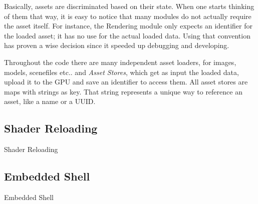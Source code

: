 Basically, assets are discriminated based on their state. When one starts thinking of them that
way, it is easy to notice that many modules do not actually require the asset itself. For
instance, the Rendering module only expects an identifier for the loaded asset; it has no use
for the actual loaded data. Using that convention has proven a wise decision since it speeded
up debugging and developing.

Throughout the code there are many independent asset loaders, for images, models, scenefiles etc..
and \textit{Asset Stores}, which get as input the loaded data, upload it to the GPU and save an
identifier to access them. All asset stores are maps with strings as key. That string represents
a unique way to reference an asset, like a name or a UUID\@.

\subsection{Shader Reloading}
Shader Reloading

\subsection{Embedded Shell}
Embedded Shell
